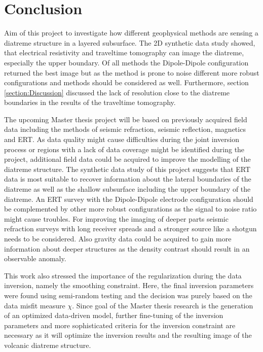 \section{Conclusion}\label{section:Conclusion}

Aim of this project to investigate how different geophysical methods are sensing a diatreme structure in a layered subsurface. The 2D synthetic data study showed, that electrical resistivity and traveltime tomography can image the diatreme, especially the upper boundary. Of all methods the Dipole-Dipole configuration returned the best image but as the method is prone to noise different more robust configurations and methods should be considered as well. Furthermore, section \ref{section:Discussion} discussed the lack of resolution close to the diatreme boundaries in the results of the traveltime tomography. 

The upcoming Master thesis project will be based on previously acquired field data including the methods of seismic refraction, seismic reflection, magnetics and ERT. As data quality might cause difficulties during the joint inversion process or regions with a lack of data coverage might be identified during the project, additional field data could be acquired to improve the modelling of the diatreme structure. The synthetic data study of this project suggests that ERT data is most suitable to recover information about the lateral boundaries of the diatreme as well as the shallow subsurface including the upper boundary of the diatreme. An ERT survey with the Dipole-Dipole electrode configuration should be complemented by other more robust configurations as the signal to noise ratio might cause troubles. For improving the imaging of deeper parts seismic refraction surveys with long receiver spreads and a stronger source like a shotgun needs to be considered. Also gravity data could be acquired to gain more information about deeper structures as the density contrast should result in an observable anomaly.

This work also stressed the importance of the regularization during the data inversion, namely the smoothing constraint. Here, the final inversion parameters were found using semi-random testing and the decision was purely based on the data misfit measure $\chi$. Since goal of the Master thesis research is the generation of an optimized data-driven model, further fine-tuning of the inversion parameters and more sophisticated criteria for the inversion constraint are necessary as it will optimize the inversion results and the resulting image of the volcanic diatreme structure.